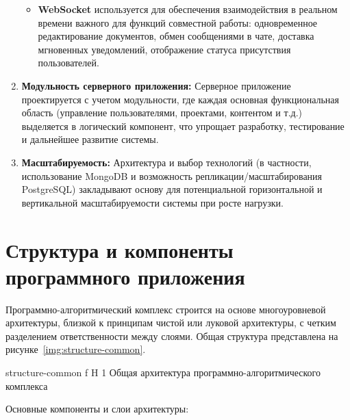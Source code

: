 \begin{enumerate}[wide=12.5mm, leftmargin=12.5mm]
\begin{itemize}
            \item \textbf{WebSocket} используется для обеспечения взаимодействия в реальном времени важного для функций совместной работы: одновременное редактирование документов, обмен сообщениями в чате, доставка мгновенных уведомлений, отображение статуса присутствия пользователей.
        \end{itemize}
    \item \textbf{Модульность серверного приложения:} Серверное приложение проектируется с учетом модульности, где каждая основная функциональная область (управление пользователями, проектами, контентом и т.д.) выделяется в логический компонент, что упрощает разработку, тестирование и дальнейшее развитие системы.
    \item \textbf{Масштабируемость:} Архитектура и выбор технологий (в частности, использование MongoDB и возможность репликации/масштабирования PostgreSQL) закладывают основу для потенциальной горизонтальной и вертикальной масштабируемости системы при росте нагрузки.
\end{enumerate}

\section{Структура и компоненты программного приложения}

Программно-алгоритмический комплекс строится на основе многоуровневой архитектуры, близкой к принципам чистой или луковой архитектуры, с четким разделением ответственности между слоями.
Общая структура представлена на рисунке~\ref{img:structure-common}.

	{structure-common}
	{f}
	{H}
	{1\textwidth}
	{Общая архитектура программно-алгоритмического комплекса}


Основные компоненты и слои архитектуры:

